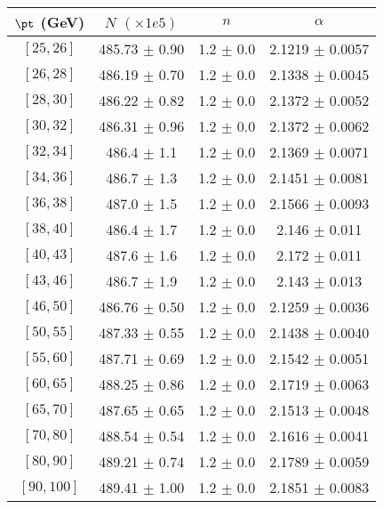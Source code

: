 \begin{tabular}{c||c|c|c}
$\pt$ (GeV) & $N$ $(\times1e5)$ & $n$ & $\alpha$ \\
\hline
$[25, 26]$ & 485.73 $\pm$ 0.90 & 1.2 $\pm$ 0.0 & 2.1219 $\pm$ 0.0057\\
$[26, 28]$ & 486.19 $\pm$ 0.70 & 1.2 $\pm$ 0.0 & 2.1338 $\pm$ 0.0045\\
$[28, 30]$ & 486.22 $\pm$ 0.82 & 1.2 $\pm$ 0.0 & 2.1372 $\pm$ 0.0052\\
$[30, 32]$ & 486.31 $\pm$ 0.96 & 1.2 $\pm$ 0.0 & 2.1372 $\pm$ 0.0062\\
$[32, 34]$ & 486.4 $\pm$ 1.1 & 1.2 $\pm$ 0.0 & 2.1369 $\pm$ 0.0071\\
$[34, 36]$ & 486.7 $\pm$ 1.3 & 1.2 $\pm$ 0.0 & 2.1451 $\pm$ 0.0081\\
$[36, 38]$ & 487.0 $\pm$ 1.5 & 1.2 $\pm$ 0.0 & 2.1566 $\pm$ 0.0093\\
$[38, 40]$ & 486.4 $\pm$ 1.7 & 1.2 $\pm$ 0.0 & 2.146 $\pm$ 0.011\\
$[40, 43]$ & 487.6 $\pm$ 1.6 & 1.2 $\pm$ 0.0 & 2.172 $\pm$ 0.011\\
$[43, 46]$ & 486.7 $\pm$ 1.9 & 1.2 $\pm$ 0.0 & 2.143 $\pm$ 0.013\\
$[46, 50]$ & 486.76 $\pm$ 0.50 & 1.2 $\pm$ 0.0 & 2.1259 $\pm$ 0.0036\\
$[50, 55]$ & 487.33 $\pm$ 0.55 & 1.2 $\pm$ 0.0 & 2.1438 $\pm$ 0.0040\\
$[55, 60]$ & 487.71 $\pm$ 0.69 & 1.2 $\pm$ 0.0 & 2.1542 $\pm$ 0.0051\\
$[60, 65]$ & 488.25 $\pm$ 0.86 & 1.2 $\pm$ 0.0 & 2.1719 $\pm$ 0.0063\\
$[65, 70]$ & 487.65 $\pm$ 0.65 & 1.2 $\pm$ 0.0 & 2.1513 $\pm$ 0.0048\\
$[70, 80]$ & 488.54 $\pm$ 0.54 & 1.2 $\pm$ 0.0 & 2.1616 $\pm$ 0.0041\\
$[80, 90]$ & 489.21 $\pm$ 0.74 & 1.2 $\pm$ 0.0 & 2.1789 $\pm$ 0.0059\\
$[90, 100]$ & 489.41 $\pm$ 1.00 & 1.2 $\pm$ 0.0 & 2.1851 $\pm$ 0.0083\\
\end{tabular}
